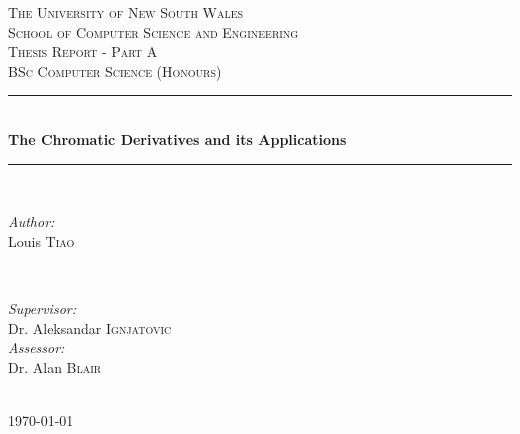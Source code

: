 \documentclass[12pt]{report} %
\begin{document}

\begin{titlepage}

\newcommand{\HRule}{\rule{\linewidth}{0.5mm}} %

\center %

\textsc{\Large The University of New South Wales}\\[0.2cm]
\textsc{\large School of Computer Science and Engineering}\\[1.5cm] %

\textsc{\large Thesis Report - Part A}\\[0.5cm] %
\textsc{BSc Computer Science (Honours)}\\[0.5cm] %

\HRule \\[0.4cm]
{ \LARGE \bfseries The Chromatic Derivatives and its Applications }\\[0.4cm] %
\HRule \\[1.5cm]

\begin{minipage}[t]{0.4\textwidth}
\begin{flushleft} \large
\emph{Author:}\\
Louis \textsc{Tiao} %
\end{flushleft}
\end{minipage}
~
\begin{minipage}[t]{0.5\textwidth}
\begin{flushright} \large
\emph{Supervisor:} \\
Dr. Aleksandar \textsc{Ignjatovic} %
\\[0.5cm]
\emph{Assessor:} \\
Dr. Alan \textsc{Blair} %
\end{flushright}
\end{minipage}\\[4cm]

{\large \today}\\[3cm] %


\vfill %

\end{titlepage}
\end{document}
